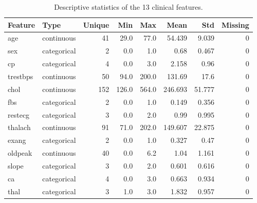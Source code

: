 \begin{table}[t]
\centering
\caption{Descriptive statistics of the 13 clinical features.}
\label{tab:features}
\footnotesize
\begin{tabular}{llrrrrrr}
\toprule
Feature & Type & Unique & Min & Max & Mean & Std & Missing \\
\midrule
age & continuous & 41 & 29.0 & 77.0 & 54.439 & 9.039 & 0 \\
sex & categorical & 2 & 0.0 & 1.0 & 0.68 & 0.467 & 0 \\
cp & categorical & 4 & 0.0 & 3.0 & 2.158 & 0.96 & 0 \\
trestbps & continuous & 50 & 94.0 & 200.0 & 131.69 & 17.6 & 0 \\
chol & continuous & 152 & 126.0 & 564.0 & 246.693 & 51.777 & 0 \\
fbs & categorical & 2 & 0.0 & 1.0 & 0.149 & 0.356 & 0 \\
restecg & categorical & 3 & 0.0 & 2.0 & 0.99 & 0.995 & 0 \\
thalach & continuous & 91 & 71.0 & 202.0 & 149.607 & 22.875 & 0 \\
exang & categorical & 2 & 0.0 & 1.0 & 0.327 & 0.47 & 0 \\
oldpeak & continuous & 40 & 0.0 & 6.2 & 1.04 & 1.161 & 0 \\
slope & categorical & 3 & 0.0 & 2.0 & 0.601 & 0.616 & 0 \\
ca & categorical & 4 & 0.0 & 3.0 & 0.663 & 0.934 & 0 \\
thal & categorical & 3 & 1.0 & 3.0 & 1.832 & 0.957 & 0 \\
\bottomrule
\end{tabular}
\end{table}
